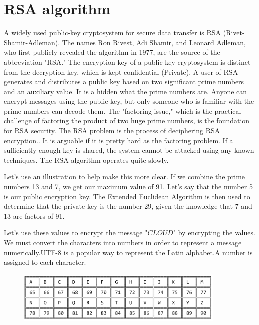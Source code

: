 \documentclass{article}
\begin{document}
\section{RSA algorithm}
A widely used public-key cryptosystem for secure data transfer is RSA (Rivet-Shamir-Adleman). The names Ron Rivest, Adi Shamir, and Leonard Adleman, who first publicly revealed the algorithm in 1977, are the source of the abbreviation "RSA." The encryption key of a public-key cryptosystem is distinct from the decryption key, which is kept confidential (Private). A user of RSA generates and distributes a public key based on two significant prime numbers and an auxiliary value. It is a hidden what the prime numbers are. Anyone can encrypt messages using the public key, but only someone who is familiar with the prime numbers can decode them.
The "factoring issue," which is the practical challenge of factoring the product of two huge prime numbers, is the foundation for RSA security.
The RSA problem is the process of deciphering RSA encryption.. It is arguable if it is pretty hard as the factoring problem. If a sufficiently enough key is shared, the system cannot be attacked using any known techniques. The RSA algorithm operates quite slowly.

Let's use an illustration to help make this more clear. If we combine the prime numbers 13 and 7, we get our maximum value of 91. Let's say that the number 5 is our public encryption key. The Extended Euclidean Algorithm is then used to determine that the private key is the number 29, given the knowledge that 7 and 13 are factors of 91.

\hspace{1cm}
\begin{centre}
\end{centre}

Let's use these values to encrypt the message "$CLOUD$" by encrypting the values.
We must convert the characters into numbers in order to represent a message numerically.UTF-8 is a popular way to represent the Latin alphabet.A number is assigned to each character.
\begin{figure}[h]
\includegraphics[width=10cm, height=2.5cm]{ASCII.png}
\centering
\end{figure}
\end{document}
